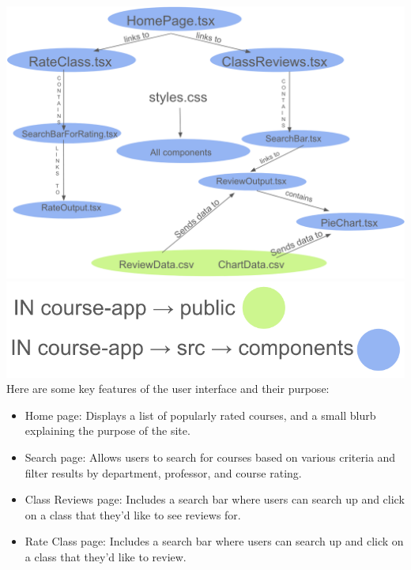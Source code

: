 \documentclass[10pt,twocolumn]{article}
\begin{document}
\centering \includegraphics[scale=.4]{architecture}\\
\includegraphics[scale=.35]{key}\\

Here are some key features of the user interface and their purpose:
\begin{itemize}
\item Home page: Displays a list of popularly rated courses, and a small blurb explaining the purpose of the site.
\item Search page: Allows users to search for courses based on various criteria and filter results by department, professor, and course rating.
\item Class Reviews page: Includes a search bar where users can search up and click on a class that they'd like to see reviews for.
\item Rate Class page:  Includes a search bar where users can search up and click on a class that they'd like to review.
\end{itemize}



\printbibliography
\end{document}
